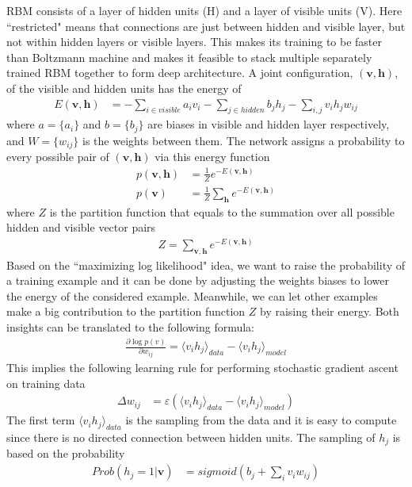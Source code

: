 \iffalse
RBM consists of a layer of hidden units (H) and a layer of visible units (V).
Here ``restricted" means that connections are just between hidden and visible layer,
but not within hidden layers or visible layers.
This makes its training to be faster than Boltzmann machine and makes it feasible to
stack multiple separately trained RBM together to form deep architecture.
A joint configuration, $(\mathbf{v, h})$, of the visible and hidden units has the energy of
\begin{align}
    E(\mathbf{v, h}) &= -\sum_{i\in visible}a_i v_i - \sum_{j\in hidden}b_j h_j - \sum_{i, j}v_i h_j w_{ij}
\end{align}
where $a=\{a_i\}$ and $b=\{b_j\}$ are biases in visible and hidden layer respectively,
and $W=\{w_{ij}\}$ is the weights between them.
The network assigns a probability to every possible pair of $(\mathbf{v, h})$ via this energy
function
\begin{align}
    p(\mathbf{v, h}) &= \frac{1}{Z} e^{-E(\mathbf{v, h})} \\
    p(\mathbf{v}) &= \frac{1}{Z} \sum_{\mathbf{h}} e^{-E(\mathbf{v, h})}
\end{align}
where $Z$ is the partition function that equals to the summation over all possible hidden
and visible vector pairs
\begin{align}
    Z = \sum_{\mathbf{v,h}} e^{-E(\mathbf{v, h})}
\end{align}
Based on the ``maximizing log likelihood" idea,
we want to raise the probability of a training example and it can be done by
adjusting the weights biases to lower the energy of the considered example.
Meanwhile, we can let other examples make a big contribution to the partition function $Z$
by raising their energy.
Both insights can be translated to the following formula:
\begin{align}
    \frac{\partial \log p(v)}{\partial w_{ij}} = \langle v_i h_j \rangle_{data} - \langle v_i h_j \rangle_{model} 
\end{align}
This implies the following learning rule for performing stochastic gradient ascent on training
data
\begin{align}
    \Delta w_{ij} &= \varepsilon (\langle v_i h_j \rangle_{data} - \langle v_i h_j \rangle_{model})
\end{align}
The first term $\langle v_i h_j \rangle_{data}$ is the sampling from the data and it is easy to
compute since there is no directed connection between hidden units.
The sampling of $h_j$ is based on the probability
\begin{align}
    Prob(h_j = 1 | \mathbf{v}) &= sigmoid(b_j + \sum_i{v_i w_{ij}})
    \label{Equ:RBMSampleHidden}
\end{align}
